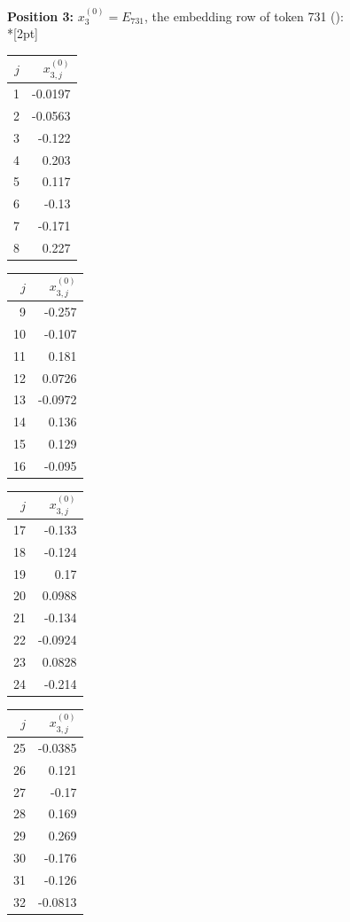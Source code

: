 \noindent \textbf{Position 3:} $x^{(0)}_{3} = E_{731}$, the embedding row of token 731 (\texttt{\textvisiblespace{}}):\\*[2pt]
{\tablefont \begin{tabular}[t]{r|r}
$j$ & $x^{(0)}_{3,j}$ \\\hline
1 & -0.0197 \\
2 & -0.0563 \\
3 & -0.122 \\
4 & 0.203 \\
5 & 0.117 \\
6 & -0.13 \\
7 & -0.171 \\
8 & 0.227
\end{tabular}\kern4pt
\begin{tabular}[t]{r|r}
$j$ & $x^{(0)}_{3,j}$ \\\hline
9 & -0.257 \\
10 & -0.107 \\
11 & 0.181 \\
12 & 0.0726 \\
13 & -0.0972 \\
14 & 0.136 \\
15 & 0.129 \\
16 & -0.095
\end{tabular}\kern4pt
\begin{tabular}[t]{r|r}
$j$ & $x^{(0)}_{3,j}$ \\\hline
17 & -0.133 \\
18 & -0.124 \\
19 & 0.17 \\
20 & 0.0988 \\
21 & -0.134 \\
22 & -0.0924 \\
23 & 0.0828 \\
24 & -0.214
\end{tabular}\kern4pt
\begin{tabular}[t]{r|r}
$j$ & $x^{(0)}_{3,j}$ \\\hline
25 & -0.0385 \\
26 & 0.121 \\
27 & -0.17 \\
28 & 0.169 \\
29 & 0.269 \\
30 & -0.176 \\
31 & -0.126 \\
32 & -0.0813
\end{tabular}\kern4pt
\begin{tabular}[t]{r|r}

\end{tabular}}
